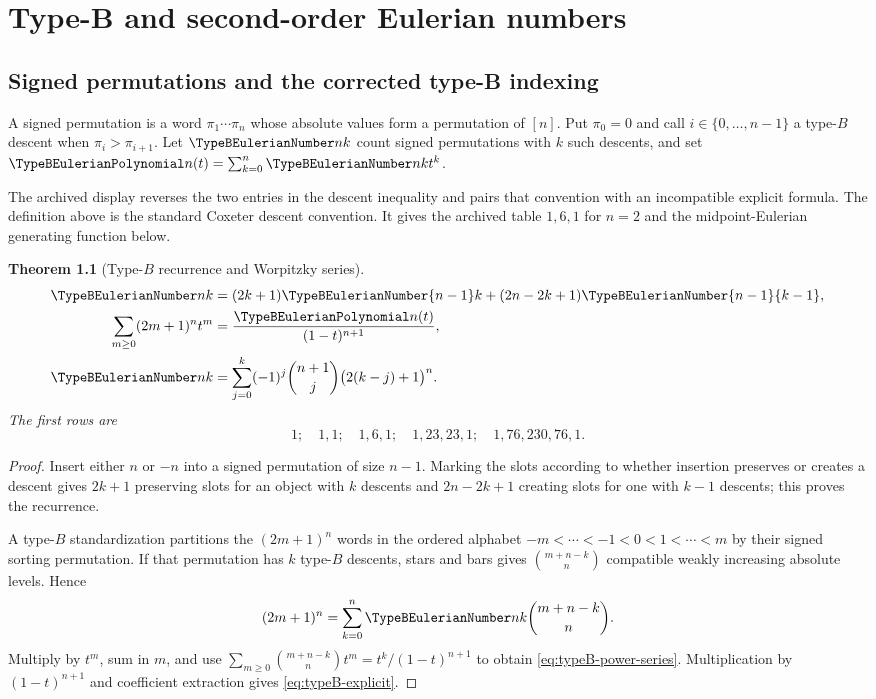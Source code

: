 \documentclass[11pt,a4paper,oneside,openany]{book}
\newtheorem{theorem}{Theorem}[chapter]
\theoremstyle{definition}
\theoremstyle{remark}
\begin{document}
\chapter{Type-B and second-order Eulerian numbers}

\section{Signed permutations and the corrected type-B indexing}
A signed permutation is a word $\pi_1\cdots\pi_n$ whose absolute values form a
permutation of $[n]$.  Put $\pi_0=0$ and call
$i\in\{0,\ldots,n-1\}$ a type-$B$ descent when $\pi_i>\pi_{i+1}$.
Let $\TypeBEulerianNumber nk$ count signed permutations with $k$ such descents, and set
$\TypeBEulerianPolynomial n(t)=\sum_{k=0}^{n}\TypeBEulerianNumber nk t^k$.

\begin{auditbox}
The archived display reverses the two entries in the descent inequality and pairs
that convention with an incompatible explicit formula.  The definition above is
the standard Coxeter descent convention.  It gives the archived table
$1,6,1$ for $n=2$ and the midpoint-Eulerian generating function below.
\end{auditbox}

\begin{theorem}[Type-$B$ recurrence and Worpitzky series]\label{thm:typeB-eulerian}
\begin{align}
 \TypeBEulerianNumber nk&=(2k+1)\TypeBEulerianNumber{n-1}k+(2n-2k+1)\TypeBEulerianNumber{n-1}{k-1},
 \label{eq:typeB-recurrence}\\
 \sum_{m\ge0}(2m+1)^nt^m&=\frac{\TypeBEulerianPolynomial n(t)}{(1-t)^{n+1}},
 \label{eq:typeB-power-series}\\
 \TypeBEulerianNumber nk&=\sum_{j=0}^{k}(-1)^j\binom{n+1}{j}
             \bigl(2(k-j)+1\bigr)^n.
 \label{eq:typeB-explicit}
\end{align}
The first rows are
\[
1;\quad 1,1;\quad1,6,1;\quad1,23,23,1;\quad1,76,230,76,1.
\]
\end{theorem}
\begin{proof}
Insert either $n$ or $-n$ into a signed permutation of size $n-1$.  Marking the
slots according to whether insertion preserves or creates a descent gives
$2k+1$ preserving slots for an object with $k$ descents and
$2n-2k+1$ creating slots for one with $k-1$ descents; this proves the recurrence.

A type-$B$ standardization partitions the $(2m+1)^n$ words in the ordered alphabet
$-m<\cdots<-1<0<1<\cdots<m$ by their signed sorting permutation.  If that
permutation has $k$ type-$B$ descents, stars and bars gives
$\binom{m+n-k}{n}$ compatible weakly increasing absolute levels.  Hence
\[
 (2m+1)^n=\sum_{k=0}^{n}\TypeBEulerianNumber nk\binom{m+n-k}{n}.
\]
Multiply by $t^m$, sum in $m$, and use
$\sum_{m\ge0}\binom{m+n-k}{n}t^m=t^k/(1-t)^{n+1}$ to obtain
\eqref{eq:typeB-power-series}.  Multiplication by $(1-t)^{n+1}$ and coefficient
extraction gives \eqref{eq:typeB-explicit}.
\end{proof}
\end{document}
